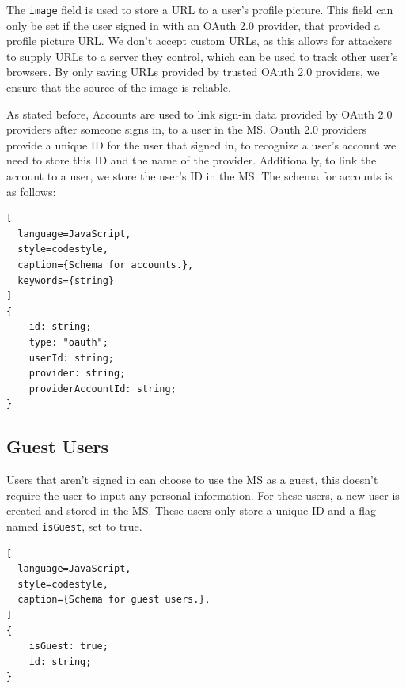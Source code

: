The \lstinline{image} field is used to store a URL to a user's profile picture. 
This field can only be set if the user signed in with an OAuth 2.0 provider,
that provided a profile picture URL.
We don't accept custom URLs,
as this allows for attackers to supply URLs to a server they control,
which can be used to track other user's browsers.
By only saving URLs provided by trusted OAuth 2.0 providers, we ensure that the
source of the image is reliable.

As stated before, Accounts are used to link sign-in data provided by OAuth 2.0 providers
after someone signs in, to a user in the MS.
Oauth 2.0 providers provide a unique ID for the user that signed in,
to recognize a user's account we need to store this ID and
the name of the provider.
Additionally, to link the account to a user, we store the user's ID in the MS.
The schema for accounts is as follows:

\begin{lstlisting}[
  language=JavaScript,
  style=codestyle,
  caption={Schema for accounts.},
  keywords={string}
]
{
    id: string;
    type: "oauth";
    userId: string;
    provider: string;
    providerAccountId: string;
}
\end{lstlisting}

\subsection{Guest Users}

Users that aren't signed in can choose to use the MS as a guest, this doesn't require
the user to input any personal information.
For these users, a new user is created and stored in the MS.
These users only store a unique ID and a flag named \lstinline{isGuest}, set to true.

\begin{lstlisting}[
  language=JavaScript,
  style=codestyle,
  caption={Schema for guest users.},
]
{
    isGuest: true;
    id: string;
} 
\end{lstlisting}


